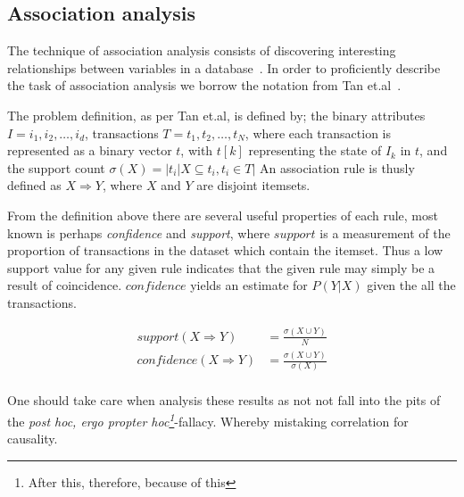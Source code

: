 \subsection{Association analysis}
	The technique of association analysis consists of discovering interesting relationships between variables
	in a database~\cite{Piateski:1991:assocrules,tan:2006:datamining,Agrawal:1993:assocrules}.
	In order to proficiently describe the task of association analysis we borrow the notation from Tan et.al~\cite{tan:2006:datamining}.

	\bigskip\noindent
	The problem definition, as per Tan et.al, is defined by; 
	the binary attributes $I = i_1, i_2, \ldots, i_d$, 
	transactions $T = t_1, t_2,\ldots, t_N$, where each transaction	is represented as a binary vector $t$, with $t[k]$ representing the state of $I_k$ in $t$, and the support count $\sigma (X) = |{t_i|X\subseteq t_i, t_i \in T}|$
	An association rule is thusly defined as $X \Rightarrow Y$, where $X$ and $Y$ are disjoint itemsets.
	
	\bigskip\noindent
	From the definition above there are several useful properties of each rule, most known is perhaps \textit{confidence} and \textit{support},
	where $support$ is a measurement of the proportion of transactions in the dataset which contain the itemset. Thus a low support value for any given rule indicates that the given rule may simply be a result of coincidence. $confidence$ yields an estimate for $P(Y|X)$ given the all the transactions.
	\begin{figure}[H]
		\begin{align}
			support(X\Rightarrow Y) &= \frac{\sigma (X \cup Y)}{N}\nonumber\\
			confidence(X\Rightarrow Y) &= \frac{\sigma (X \cup Y)}{\sigma (X)}\nonumber\\
		\end{align}
	\end{figure}
	
	\bigskip\noindent
	One should take care when analysis these results as not not fall into the pits of the \textit{post hoc, ergo propter hoc\footnote{After this, therefore, because of this}}-fallacy\cite{posthoc}. Whereby mistaking correlation for causality.
	
	